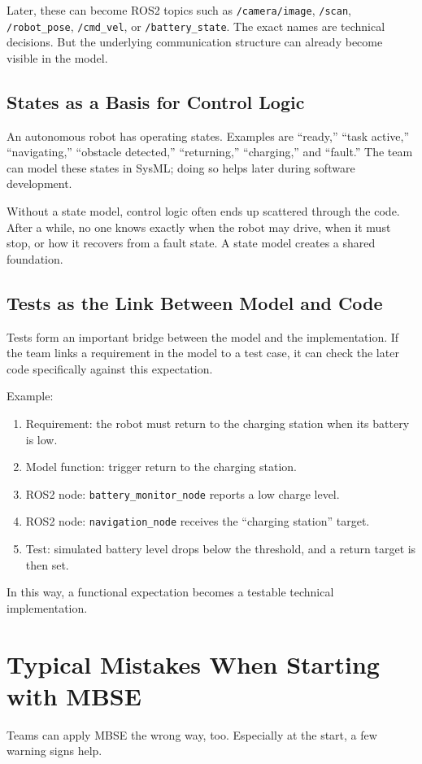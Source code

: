 Later, these can become ROS2 topics such as \texttt{/camera/image}, \texttt{/scan}, \texttt{/robot\_pose}, \texttt{/cmd\_vel}, or \texttt{/battery\_state}. The exact names are technical decisions. But the underlying communication structure can already become visible in the model.

\subsection{States as a Basis for Control Logic}
An autonomous robot has operating states. Examples are \enquote{ready,} \enquote{task active,} \enquote{navigating,} \enquote{obstacle detected,} \enquote{returning,} \enquote{charging,} and \enquote{fault.} The team can model these states in SysML; doing so helps later during software development.

Without a state model, control logic often ends up scattered through the code. After a while, no one knows exactly when the robot may drive, when it must stop, or how it recovers from a fault state. A state model creates a shared foundation.

\subsection{Tests as the Link Between Model and Code}
Tests form an important bridge between the model and the implementation. If the team links a requirement in the model to a test case, it can check the later code specifically against this expectation.

Example:

\begin{enumerate}
    \item Requirement: the robot must return to the charging station when its battery is low.
    \item Model function: trigger return to the charging station.
    \item ROS2 node: \texttt{battery\_monitor\_node} reports a low charge level.
    \item ROS2 node: \texttt{navigation\_node} receives the \enquote{charging station} target.
    \item Test: simulated battery level drops below the threshold, and a return target is then set.
\end{enumerate}

In this way, a functional expectation becomes a testable technical implementation.

\section{Typical Mistakes When Starting with MBSE}
Teams can apply MBSE the wrong way, too. Especially at the start, a few warning signs help.

